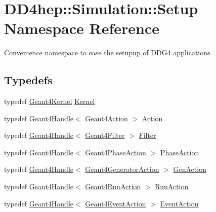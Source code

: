 \hypertarget{namespace_d_d4hep_1_1_simulation_1_1_setup}{
\section{DD4hep::Simulation::Setup Namespace Reference}
\label{namespace_d_d4hep_1_1_simulation_1_1_setup}
}


Convenience namespace to ease the setupup of DDG4 applications.  
\subsection*{Typedefs}
\begin{DoxyCompactItemize}
\item 
typedef \hyperlink{class_d_d4hep_1_1_simulation_1_1_geant4_kernel}{Geant4Kernel} \hyperlink{namespace_d_d4hep_1_1_simulation_1_1_setup_a463a13fee8e841935ffc1c013755240e}{Kernel}
\item 
typedef \hyperlink{class_d_d4hep_1_1_simulation_1_1_geant4_handle}{Geant4Handle}$<$ \hyperlink{class_d_d4hep_1_1_simulation_1_1_geant4_action}{Geant4Action} $>$ \hyperlink{namespace_d_d4hep_1_1_simulation_1_1_setup_aa958972310161bf099d9d22e59d257ab}{Action}
\item 
typedef \hyperlink{class_d_d4hep_1_1_simulation_1_1_geant4_handle}{Geant4Handle}$<$ \hyperlink{class_d_d4hep_1_1_simulation_1_1_geant4_filter}{Geant4Filter} $>$ \hyperlink{namespace_d_d4hep_1_1_simulation_1_1_setup_ad8d99728c073de63615427fbb8a1992a}{Filter}
\item 
typedef \hyperlink{class_d_d4hep_1_1_simulation_1_1_geant4_handle}{Geant4Handle}$<$ \hyperlink{class_d_d4hep_1_1_simulation_1_1_geant4_phase_action}{Geant4PhaseAction} $>$ \hyperlink{namespace_d_d4hep_1_1_simulation_1_1_setup_a2dad27b7db15a1ff3882c15d5182eb2b}{PhaseAction}
\item 
typedef \hyperlink{class_d_d4hep_1_1_simulation_1_1_geant4_handle}{Geant4Handle}$<$ \hyperlink{class_d_d4hep_1_1_simulation_1_1_geant4_generator_action}{Geant4GeneratorAction} $>$ \hyperlink{namespace_d_d4hep_1_1_simulation_1_1_setup_a14c151f5ea2ebe374531259e0a2d5446}{GenAction}
\item 
typedef \hyperlink{class_d_d4hep_1_1_simulation_1_1_geant4_handle}{Geant4Handle}$<$ \hyperlink{class_d_d4hep_1_1_simulation_1_1_geant4_run_action}{Geant4RunAction} $>$ \hyperlink{namespace_d_d4hep_1_1_simulation_1_1_setup_a9a6172ddf65752b351495ec3d99c6379}{RunAction}
\item 
typedef \hyperlink{class_d_d4hep_1_1_simulation_1_1_geant4_handle}{Geant4Handle}$<$ \hyperlink{class_d_d4hep_1_1_simulation_1_1_geant4_event_action}{Geant4EventAction} $>$ \hyperlink{namespace_d_d4hep_1_1_simulation_1_1_setup_ad2f4a62fb2f0e3977ad95f8414ed8d26}{EventAction}

\end{DoxyCompactItemize}
